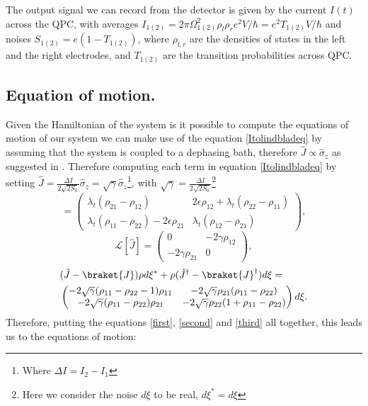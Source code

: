 The output signal we can record from the detector is given by the current $I(t)$ across the QPC, with averages $I_{1(2)}=2\pi\Omega_{1(2)}^{2}\rho_l\rho_r e^{2} V /\hbar=e^{2}T_{1(2)}V/\hbar$ and noises $S_{1(2)}=e(1-T_{1(2)})$, where $\rho_{l,r}$ are the densities of states in the left and the right electrodes, and $T_{1(2)}$ are the transition probabilities across QPC.
\subsection{Equation of motion.}
Given the Hamiltonian of the system is it possible to compute the equations of motion of our system we can make use of the equation \eqref{Itolindbladeq} by assuming that the system is coupled to a dephasing bath, therefore $\hat{J}\propto \hat{\sigma}_z$ as suggested in \cite{PhysRevB.56.15215}. Therefore computing each term in equation \eqref{Itolindbladeq} by setting $\hat{J}=\frac{\Delta I}{2\sqrt{2S_0}}\hat{\sigma}_z=\sqrt{\gamma}\hat{\sigma}_{z}$\footnote{Where $\Delta I=I_{2}-I_1$}, with $\sqrt{\gamma}=\frac{\Delta I}{2\sqrt{2S_0}}$\footnote{Here we consider the noise $d\xi$ to be real, $d\xi^{*}=d\xi$}
\begin{equation}
[\hat{H},\rho]=\begin{pmatrix}
\lambda_t(\rho_{21}-\rho_{12}) & 2\epsilon\rho_{12}+\lambda_t(\rho_{22}-\rho_{11})\\
\lambda_t(\rho_{11}-\rho_{22})-2\epsilon\rho_{21} & \lambda_t(\rho_{12}-\rho_{21}) 
\end{pmatrix},
\label{first}
\end{equation}
\begin{equation}
\mathcal{L}[\hat{J}]=\begin{pmatrix}
0 & -2\gamma \rho_{12}\\
-2\gamma\rho_{21} & 0
\end{pmatrix},
\label{second}
\end{equation}
\begin{align}
&(\hat{J}-\braket{J})\rho d\xi^{*}+\rho(\hat{J}^{\dagger}-\braket{J}^{\dagger})d\xi=\nonumber\\
&\begin{pmatrix}
-2\sqrt{\gamma}(\rho_{11}-\rho_{22}-1)\rho_{11} & -2\sqrt{\gamma}\rho_{21}(\rho_{11}-\rho_{22})\\
-2\sqrt{\gamma}(\rho_{11}-\rho_{22})\rho_{21} & -2\sqrt{\gamma}\rho_{22}(1+\rho_{11}-\rho_{22})
\end{pmatrix}d\xi.
\label{third}
\end{align}
Therefore, putting the equations \eqref{first}, \eqref{second} and \eqref{third} all together, this leads us to the equations of motion:
